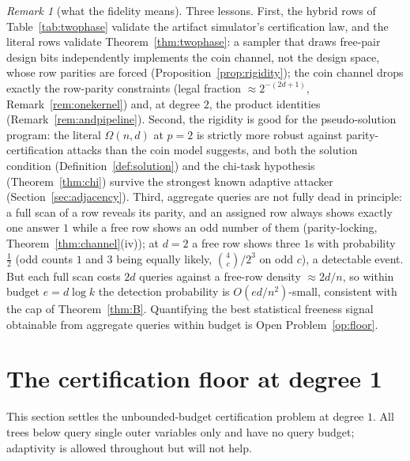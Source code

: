 \documentclass[11pt]{article}
\theoremstyle{definition}
\theoremstyle{remark}
\newtheorem{remark}[theorem]{Remark}
\begin{document}
\begin{remark}[what the fidelity means]\label{rem:fidelity}
Three lessons.  First, the hybrid rows of Table~\ref{tab:twophase}
validate the artifact simulator's certification law, and the literal
rows validate Theorem~\ref{thm:twophase}: a
sampler that draws free-pair design bits independently implements the
coin channel, not the design space, whose row parities are forced
(Proposition~\ref{prop:rigidity}); the coin channel drops exactly the
row-parity constraints (legal fraction $\approx2^{-(2d+1)}$,
Remark~\ref{rem:onekernel}) and, at degree $2$, the product identities
(Remark~\ref{rem:andpipeline}).  Second, the rigidity is good for
the pseudo-solution program: the literal $\Omega(n,d)$ at $p=2$ is
strictly more robust against parity-certification attacks than the
coin model suggests, and both the solution condition
(Definition~\ref{def:solution}) and the chi-task hypothesis
(Theorem~\ref{thm:chi}) survive the strongest known adaptive attacker
(Section~\ref{sec:adjacency}).  Third, aggregate queries are not fully
dead in principle: a full scan of a row reveals its parity, and an
assigned row always shows exactly one answer $1$ while a free row
shows an odd number of them (parity-locking,
Theorem~\ref{thm:channel}(iv)); at $d=2$ a free row shows three $1$s
with probability $\frac12$ (odd counts $1$ and $3$ being equally
likely, $\binom{4}{c}/2^{3}$ on odd $c$), a detectable event.  But each
full scan costs $2d$ queries against a free-row density
$\approx 2d/n$, so within budget $e=d\log k$ the detection probability
is $O(ed/n^2)$-small, consistent with the cap of Theorem~\ref{thm:B}.
Quantifying the best statistical freeness signal obtainable from
aggregate queries within budget is Open Problem~\ref{op:floor}.
\end{remark}

\section{The certification floor at degree 1}\label{sec:floor}

This section settles the unbounded-budget certification problem at
degree $1$.  All trees below query single outer variables only and have
no query budget; adaptivity is allowed throughout but will not help.
\end{document}

